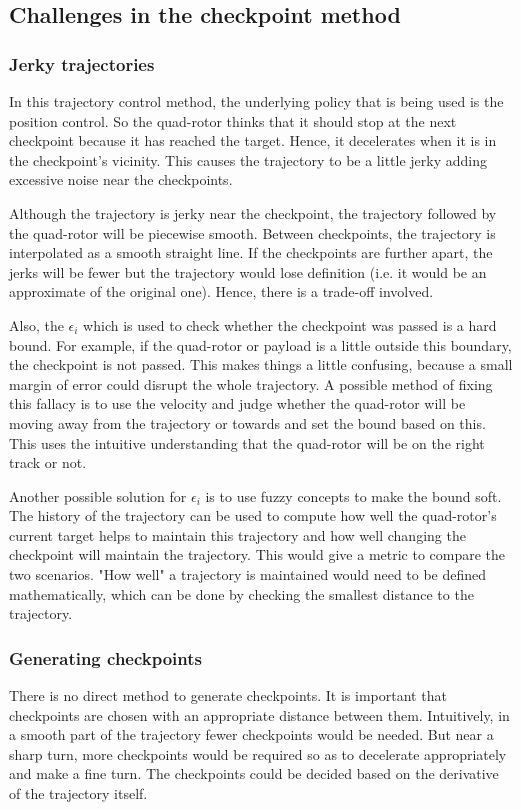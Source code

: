 \documentclass[hidelinks,BTech]{iitmdiss}
\begin{document}
\subsection*{Challenges in the checkpoint method}

\subsubsection{Jerky trajectories}
In this trajectory control method, the underlying policy that is being used is the position control. So the quad-rotor thinks that it should stop at the next checkpoint because it has reached the target. Hence, it decelerates when it is in the checkpoint's vicinity. This causes the trajectory to be a little jerky adding excessive noise near the checkpoints.

Although the trajectory is jerky near the checkpoint, the trajectory followed by the quad-rotor will be piecewise smooth. Between checkpoints, the trajectory is interpolated as a smooth straight line. If the checkpoints are further apart, the jerks will be fewer but the trajectory would lose definition (i.e. it would be an approximate of the original one). Hence, there is a trade-off involved.

Also, the $\epsilon_i$ which is used to check whether the checkpoint was passed is a hard bound. For example, if the quad-rotor or payload is a little outside this boundary, the checkpoint is not passed. This makes things a little confusing, because a small margin of error could disrupt the whole trajectory. A possible method of fixing this fallacy is to use the velocity and judge whether the quad-rotor will be moving away from the trajectory or towards and set the bound based on this. This uses the intuitive understanding that the quad-rotor will be on the right track or not.

Another possible solution for $\epsilon_i$ is to use fuzzy concepts to make the bound soft. The history of the trajectory can be used to compute how well the quad-rotor's current target helps to maintain this trajectory and how well changing the checkpoint will maintain the trajectory. This would give a metric to compare the two scenarios. "How well" a trajectory is maintained would need to be defined mathematically, which can be done by checking the smallest distance to the trajectory.

\subsubsection{Generating checkpoints}
There is no direct method to generate checkpoints. It is important that checkpoints are chosen with an appropriate distance between them. Intuitively, in a smooth part of the trajectory fewer checkpoints would be needed. But near a sharp turn, more checkpoints would be required so as to decelerate appropriately and make a fine turn. The checkpoints could be decided based on the derivative of the trajectory itself.
\end{document}
